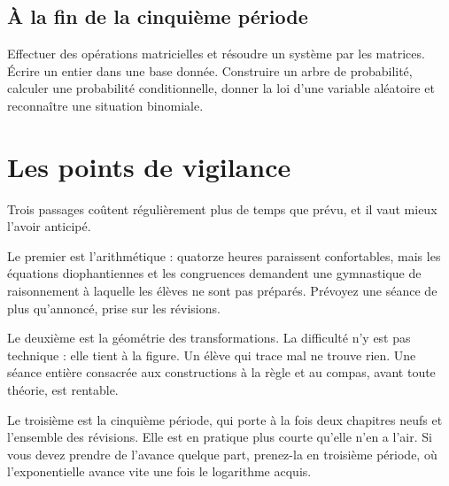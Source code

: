 \subsection*{À la fin de la cinquième période}

Effectuer des opérations matricielles et résoudre un système par les matrices.
Écrire un entier dans une base donnée. Construire un arbre de probabilité,
calculer une probabilité conditionnelle, donner la loi d'une variable
aléatoire et reconnaître une situation binomiale.

\section*{Les points de vigilance}

Trois passages coûtent régulièrement plus de temps que prévu, et il vaut mieux
l'avoir anticipé.

Le premier est l'arithmétique : quatorze heures paraissent confortables, mais
les équations diophantiennes et les congruences demandent une gymnastique de
raisonnement à laquelle les élèves ne sont pas préparés. Prévoyez une séance
de plus qu'annoncé, prise sur les révisions.

Le deuxième est la géométrie des transformations. La difficulté n'y est pas
technique : elle tient à la figure. Un élève qui trace mal ne trouve rien. Une
séance entière consacrée aux constructions à la règle et au compas, avant
toute théorie, est rentable.

Le troisième est la cinquième période, qui porte à la fois deux chapitres
neufs et l'ensemble des révisions. Elle est en pratique plus courte qu'elle
n'en a l'air. Si vous devez prendre de l'avance quelque part, prenez-la en
troisième période, où l'exponentielle avance vite une fois le logarithme
acquis.

